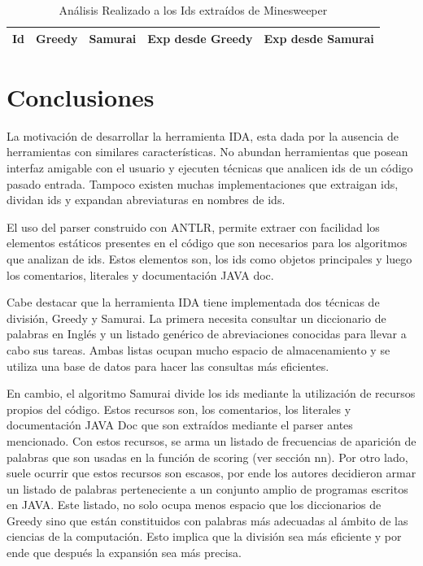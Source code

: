 \documentclass[a4paper,12pt]{report}
\begin{document}
\begin{table}
	
		\centering
   		\begin{tabular}{| c | c | c | c | c |}      
       \hline
  	   \textsf{Id} & \textsf{Greedy} & \textsf{Samurai} & \textsf{Exp desde Greedy} & \textsf{Exp desde Samurai} \\ \hline


 

  \end{tabular}  
	 
   \caption{Análisis Realizado a los Ids extraídos de Minesweeper}
   \label{tabla5}
     
\end{table}


\chapter{Conclusiones}

La motivación de desarrollar la herramienta IDA, esta dada por la ausencia de herramientas con similares características. No abundan herramientas que posean interfaz amigable con el usuario y ejecuten técnicas que analicen ids de un código pasado entrada. Tampoco existen muchas implementaciones que extraigan ids, dividan ids y expandan abreviaturas en nombres de ids. 

El uso del parser construido con ANTLR, permite extraer con facilidad los elementos estáticos presentes en el código que son necesarios para los algoritmos que analizan de ids. Estos elementos son, los ids como objetos principales y luego los comentarios, literales y documentación JAVA doc.

Cabe destacar que la herramienta IDA tiene implementada dos técnicas de división, Greedy y Samurai. La primera necesita consultar un diccionario de palabras en Inglés y un listado genérico de abreviaciones conocidas para llevar a cabo sus tareas. Ambas listas ocupan mucho espacio de almacenamiento y se utiliza una base de datos para hacer las consultas más eficientes. 

En cambio, el algoritmo Samurai divide los ids mediante la utilización de recursos propios del código. Estos recursos son, los comentarios, los literales y documentación JAVA Doc que son extraídos mediante el parser antes mencionado. Con estos recursos, se arma un listado de frecuencias de aparición de palabras que son usadas en la función de scoring (ver sección nn). Por otro lado, suele ocurrir que estos recursos son escasos, por ende los autores decidieron armar un listado de palabras perteneciente a un conjunto amplio de programas escritos en JAVA. Este listado, no solo ocupa menos espacio que los diccionarios de Greedy sino que están constituidos con palabras más adecuadas al ámbito de las ciencias de la computación. Esto implica que la división sea más eficiente y por ende que después la expansión sea más precisa.
\end{document}
